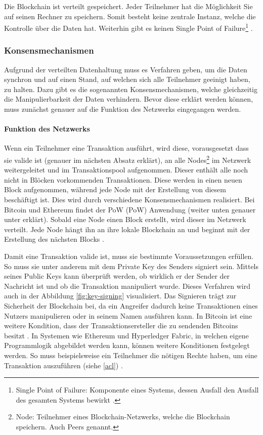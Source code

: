 Die Blockchain ist verteilt gespeichert. Jeder Teilnehmer hat die Möglichkeit Sie auf seinen Rechner zu speichern. Somit besteht keine zentrale Instanz, welche die Kontrolle über die Daten hat. Weiterhin gibt es keinen Single Point of Failure\footnote{Single Point of Failure: Komponente eines Systems, dessen Ausfall den Ausfall des gesamten Systems bewirkt \cite{KshetriCanBlockchainStrengthen2017}.} \cite{KshetriCanBlockchainStrengthen2017}.

\label{subsec:konsens}
\subsubsection{Konsensmechanismen}
Aufgrund der verteilten Datenhaltung muss es Verfahren geben, um die Daten synchron und auf einen Stand, auf welchen sich alle Teilnehmer geeinigt haben, zu halten. Dazu gibt es die sogenannten Konsensmechanismen, welche gleichzeitig die Manipulierbarkeit der Daten verhindern. Bevor diese erklärt werden können, muss zunächst genauer auf die Funktion des Netzwerks eingegangen werden.

\paragraph{Funktion des Netzwerks}
Wenn ein Teilnehmer eine Transaktion ausführt, wird diese, vorausgesetzt dass sie valide ist (genauer im nächsten Absatz erklärt), an alle Nodes\footnote{Node: Teilnehmer eines Blockchain-Netzwerks, welche die Blockchain speichern. Auch Peers genannt.} im Netzwerk weitergeleitet und im Transaktionspool aufgenommen. Dieser enthält alle noch nicht in Blöcken vorkommenden Transaktionen. Diese werden in einen neuen Block aufgenommen, während jede Node mit der Erstellung von diesem beschäftigt ist. Dies wird durch verschiedene Konsensmechanismen realisiert. Bei Bitcoin und Ethereum findet der \acl{PoW} (\acs{PoW}) Anwendung (weiter unten genauer unter erklärt). Sobald eine Node einen Block erstellt, wird dieser im Netzwerk verteilt. Jede Node hängt ihn an ihre lokale Blockchain an und beginnt mit der Erstellung des nächsten Blocks \cite[S.~200 ff.]{AntonopoulosMasteringbitcoin2015}.

Damit eine Transaktion valide ist, muss sie bestimmte Voraussetzungen erfüllen. So muss sie unter anderem mit dem Private Key des Senders signiert sein. Mittels seines Public Keys kann überprüft werden, ob wirklich er der Sender der Nachricht ist und ob die Transaktion manipuliert wurde. Dieses Verfahren wird auch in der Abbildung \ref{fig:key-signing} visualisiert. Das Signieren trägt zur Sicherheit der Blockchain bei, da ein Angreifer dadurch keine Transaktionen eines Nutzers manipulieren oder in seinem Namen ausführen kann. In Bitcoin ist eine weitere Kondition, dass der Transaktionsersteller die zu sendenden Bitcoins besitzt \cite[S.~18]{AntonopoulosMasteringbitcoin2015}. In Systemen wie Ethereum und Hyperledger Fabric, in welchen eigene Programmlogik abgebildet werden kann, können weitere Konditionen festgelegt werden. So muss beispielsweise ein Teilnehmer die nötigen Rechte haben, um eine Transaktion auszuführen (siehe \ref{acl}) \cite{HyperledgerComposerTeamAccessControlLanguage}.

